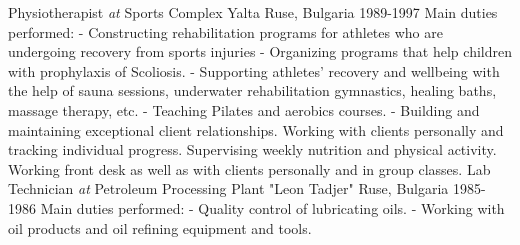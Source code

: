 \vspace{+3mm}
\cventry
{Physiotherapist \textit{at}  Sports Complex Yalta}
{Ruse, Bulgaria 1989-1997}
{
Main duties performed: 
\newline
\hspace{3ex} - Constructing rehabilitation programs for athletes who are undergoing recovery from sports injuries
\newline
\hspace{3ex} - Organizing programs that help children with prophylaxis of Scoliosis.   
\newline
\hspace{3ex} - Supporting athletes' recovery and wellbeing with the help of sauna sessions, underwater rehabilitation gymnastics, 
healing baths, massage therapy, etc.
\newline
\hspace{3ex} - Teaching Pilates and aerobics courses.
\newline
\hspace{3ex} - Building and maintaining exceptional client relationships. Working with clients personally and tracking individual progress. Supervising weekly nutrition and physical activity. Working front desk as well as with clients personally and in group classes. 
}
\vspace{+3mm}
\cventry
{Lab Technician \textit{at} Petroleum Processing Plant "Leon Tadjer"}
{Ruse, Bulgaria 1985-1986}
{
Main duties performed: 
\newline
\hspace{3ex} - Quality control of lubricating oils.
\newline
\hspace{3ex} - Working with oil products and oil refining equipment and tools.
}